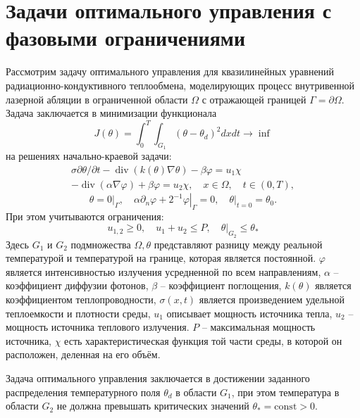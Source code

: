 

\section{Задачи оптимального управления с фазовыми ограничениями}
\label{sec:ch3:sec2}
%
Рассмотрим задачу оптимального
управления для квазилинейных уравнений радиационно-кондуктивного
теплообмена, моделирующих процесс внутривенной
лазерной абляции в ограниченной области $\Omega$ с отражающей границей $\Gamma=\partial\Omega$.
Задача заключается в минимизации функционала
\[ J(\theta)=\int_{0}^{T} \int_{G_{1}}\left(\theta-\theta_{d}\right)^{2} dx dt \rightarrow \inf \]
на решениях начально-краевой задачи:
\begin{equation}
    \label{eq:3_2:1}
    \begin{gathered}
        \sigma \partial \theta / \partial t-\operatorname{div}(k(\theta)
        \nabla \theta)-\beta \varphi=u_{1} \chi \\
        -\operatorname{div}(\alpha \nabla \varphi)+\beta \varphi=u_{2}
        \chi, \quad x \in \Omega, \quad t \in(0, T),
    \end{gathered}
\end{equation}
\begin{equation}
    \label{eq:3_2:2}
    \theta=\left.0\right|_{\Gamma},
    \quad \alpha \partial_{n} \varphi
    +\left.2^{-1} \varphi\right|_{\Gamma}=0,
    \left.\quad \theta\right|_{t=0}=\theta_{0}.
\end{equation}
При этом учитываются ограничения:
\[ u_{1,2} \geq 0, \quad u_{1}+u_{2} \leq P, \left.\quad \theta\right|_{G_{2}} \leq \theta_{*} \]
Здесь $G_{1}$ и $G_{2}$ подмножества $\Omega, \theta$
представляют разницу между реальной температурой
и температурой на границе, которая является постоянной.
$\varphi$ является интенсивностью излучения усредненной по всем направлениям,
$\alpha$ -- коэффициент диффузии фотонов, $\beta$ -- коэффициент поглощения,
$k(\theta)$ является коэффициентом теплопроводности, $\sigma(x, t)$
является произведением удельной теплоемкости и плотности среды, $u_{1}$
описывает мощность источника тепла, $u_{2}$ -- мощность источника теплового излучения.
$P$ -- максимальная мощность источника,
$\chi$ есть характеристическая функция той части среды,
в которой он расположен, деленная на его объём.

\begin{remark}
    Задача оптимального управления заключается в достижении заданного распределения
    температурного поля $\theta_{d}$ в области $G_{1}$, при этом температура в области
    $G_{2}$ не должна превышать критических значений $\theta_{*}=\text{const}>0$.
\end{remark}

